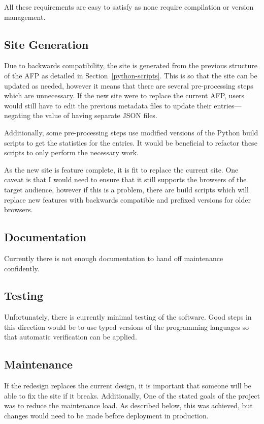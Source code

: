 \documentclass[bsc,frontabs,oneside,singlespacing,parskip,deptreport,logo]{infthesis}
\begin{document}
All these requirements are easy to satisfy as none require compilation or version management. 

\subsection{Site Generation}

Due to backwards compatibility, the site is generated from the previous structure of the AFP as detailed in Section~\ref{python-scripts}. This is so that the site can be updated as needed, however it means that there are several pre-processing steps which are unnecessary. If the new site were to replace the current AFP, users would still have to edit the previous metadata files to update their entries---negating the value of having separate JSON files.

Additionally, some pre-processing steps use modified versions of the Python build scripts to get the statistics for the entries. It would be beneficial to refactor these scripts to only perform the necessary work. 

As the new site is feature complete, it is fit to replace the current site. One caveat is that I would need to ensure that it still supports the browsers of the target audience, however if this is a problem, there are build scripts which will replace new features with backwards compatible and prefixed versions for older browsers.

\subsection{Documentation}

Currently there is not enough documentation to hand off maintenance confidently. 

\subsection{Testing}

Unfortunately, there is currently minimal testing of the software. Good steps in this direction would be to use typed versions of the programming languages so that automatic verification can be applied.

\subsection{Maintenance}
\cbstart
If the redesign replaces the current design, it is important that someone will be able to fix the site if it breaks. Additionally, One of the stated goals of the project was to reduce the maintenance load. As described below, this was achieved, but changes would need to be made before deployment in production. 
\cbend
\end{document}

